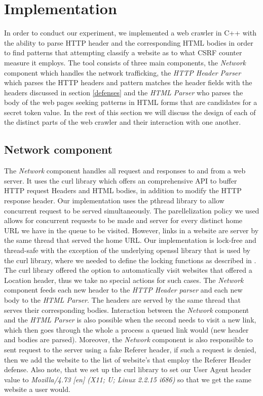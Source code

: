 \label{implementation}
\section{Implementation} 
In order to conduct our experiment, we implemented a web crawler in C++ with the ability to parse HTTP header and the 
corresponding HTML bodies in order to find patterns that attempting classify a website as to what CSRF counter measure it
employs. The tool consists of three main components, the \emph{Network} component 
which handles the network trafficking, the \emph{HTTP Header Parser} which parses the HTTP headers and pattern matches 
the header fields with the headers discussed in section \ref{defenses} and the \emph{HTML Parser} who parses the body of 
the web pages seeking patterns in HTML forms that are candidates for a secret token value.  In the rest of this section we will 
discuss the design of each of the distinct parts of the web crawler and their interaction with one another.

\subsection{Network component}
The \emph{Network} component handles all request and responses to and from a web server.  It uses the curl library 
\cite{website:curl}
which offers an comprehensive API to buffer HTTP request Headers and HTML bodies, in addition to modify the HTTP response 
header.  Our implementation uses the pthread library to allow concurrent request to be served simultaneously.  The 
parellelization policy we used allows for concurrent requests to be made and server for every distinct home URL we have
in the queue to be visited.  However, links in a website are server by the same thread that served the home URL.  Our 
implementation is lock-free and thread-safe with the exception of the underlying openssl library that is used by 
the curl library, where we needed to define the locking functions as described in \cite{website:openssl-threads}.  The curl 
library offered the option to automatically visit websites that offered a Location header, thus we take no special
actions for such cases.  The \emph{Network} component feeds each new header to the \emph{HTTP Header parser} and 
each new body to the \emph{HTML Parser}.  The headers are served by the same thread that serves their corresponding
bodies.  Interaction between the \emph{Network} component and the \emph{HTML Parser} is also possible when the second
needs to visit a new link, which then goes through the whole a process a queued link would (new header and bodies are
parsed). Moreover, the \emph{Network} component is also responsible to sent request to the server using a fake Referer
header, if such a request is denied, then we add the website to the list of website's that employ the Referer Header
defense.  Also note, that we set up the curl library to set our User Agent header value to 
\emph{Mozilla/4.73 [en] (X11; U; Linux 2.2.15 i686)} so that we get the same website a user would.

